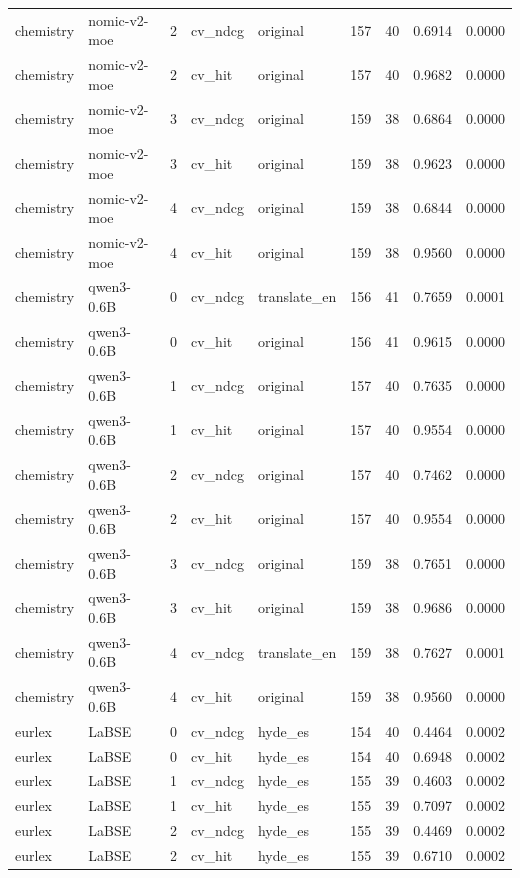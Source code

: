 \begin{tabular}{llrllrrrr}
chemistry & nomic-v2-moe & 2 & cv\_ndcg & original & 157 & 40 & 0.6914 & 0.0000 \\
chemistry & nomic-v2-moe & 2 & cv\_hit & original & 157 & 40 & 0.9682 & 0.0000 \\
chemistry & nomic-v2-moe & 3 & cv\_ndcg & original & 159 & 38 & 0.6864 & 0.0000 \\
chemistry & nomic-v2-moe & 3 & cv\_hit & original & 159 & 38 & 0.9623 & 0.0000 \\
chemistry & nomic-v2-moe & 4 & cv\_ndcg & original & 159 & 38 & 0.6844 & 0.0000 \\
chemistry & nomic-v2-moe & 4 & cv\_hit & original & 159 & 38 & 0.9560 & 0.0000 \\
chemistry & qwen3-0.6B & 0 & cv\_ndcg & translate\_en & 156 & 41 & 0.7659 & 0.0001 \\
chemistry & qwen3-0.6B & 0 & cv\_hit & original & 156 & 41 & 0.9615 & 0.0000 \\
chemistry & qwen3-0.6B & 1 & cv\_ndcg & original & 157 & 40 & 0.7635 & 0.0000 \\
chemistry & qwen3-0.6B & 1 & cv\_hit & original & 157 & 40 & 0.9554 & 0.0000 \\
chemistry & qwen3-0.6B & 2 & cv\_ndcg & original & 157 & 40 & 0.7462 & 0.0000 \\
chemistry & qwen3-0.6B & 2 & cv\_hit & original & 157 & 40 & 0.9554 & 0.0000 \\
chemistry & qwen3-0.6B & 3 & cv\_ndcg & original & 159 & 38 & 0.7651 & 0.0000 \\
chemistry & qwen3-0.6B & 3 & cv\_hit & original & 159 & 38 & 0.9686 & 0.0000 \\
chemistry & qwen3-0.6B & 4 & cv\_ndcg & translate\_en & 159 & 38 & 0.7627 & 0.0001 \\
chemistry & qwen3-0.6B & 4 & cv\_hit & original & 159 & 38 & 0.9560 & 0.0000 \\
eurlex & LaBSE & 0 & cv\_ndcg & hyde\_es & 154 & 40 & 0.4464 & 0.0002 \\
eurlex & LaBSE & 0 & cv\_hit & hyde\_es & 154 & 40 & 0.6948 & 0.0002 \\
eurlex & LaBSE & 1 & cv\_ndcg & hyde\_es & 155 & 39 & 0.4603 & 0.0002 \\
eurlex & LaBSE & 1 & cv\_hit & hyde\_es & 155 & 39 & 0.7097 & 0.0002 \\
eurlex & LaBSE & 2 & cv\_ndcg & hyde\_es & 155 & 39 & 0.4469 & 0.0002 \\
eurlex & LaBSE & 2 & cv\_hit & hyde\_es & 155 & 39 & 0.6710 & 0.0002 \\

\end{tabular}
